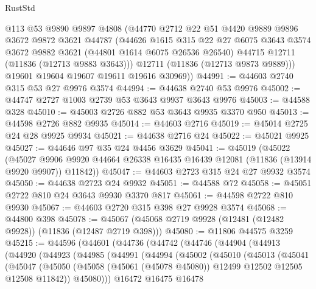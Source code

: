 \begin{lexlean}{RustStd}
\begin{coremodule}
        @113
        @53
        @9890
        @9897
        @4808
        (@44770
          @2712
          @22
          @51
          @4420
          @9889
          @9896
          @3672
          @9872
          @3621
          @44787
          (@44626
            @1615
            @315
            @22
            @27
            @6075
            @3643
            @3574
            @3672
            @9882
            @3621
            (@44801 @1614 @6075 @26536 @26540)
            @44715
            @12711
            (@11836 (@12713 @9883 @3643)))
          @12711
          (@11836 (@12713 @9873 @9889)))
        @19601
        @19604
        @19607
        @19611
        @19616
        @30969))
@44991 := @44603 @2740 @315 @53 @27 @9976 @3574
@44994 := @44638 @2740 @53 @9976
@45002 := @44747 @2727 @1003 @2739 @53 @3643 @9937 @3643 @9976
@45003 := @44588 @328
@45010 := @45003 @2726 @882 @53 @3643 @9935 @3370 @950
@45013 := @44598 @2726 @882 @9935
@45014 := @44603 @2716
@45019 := @45014 @2725 @24 @28 @9925 @9934
@45021 := @44638 @2716 @24
@45022 := @45021 @9925
@45027 := @44646 @97 @35 @24 @4456 @3629
@45041 := @45019
    (@45022
      (@45027 @9906 @9920 @44664 @26338 @16435 @16439 @12081 (@11836 (@13914 @9920 @9907)) @11842))
@45047 := @44603 @2723 @315 @24 @27 @9932 @3574
@45050 := @44638 @2723 @24 @9932
@45051 := @44588 @72
@45058 := @45051 @2722 @810 @24 @3643 @9930 @3370 @817
@45061 := @44598 @2722 @810 @9930
@45067 := @44603 @2720 @315 @398 @27 @9928 @3574
@45068 := @44800 @398
@45078 := @45067 (@45068 @2719 @9928 (@12481 (@12482 @9928)) (@11836 (@12487 @2719 @398)))
@45080 := @11806 @44575 @3259
@45215 := @44596
    (@44601
      (@44736
        (@44742
          (@44746
            (@44904
              (@44913
                (@44920
                  (@44923
                    (@44985
                      (@44991
                        (@44994
                          (@45002
                            (@45010
                              (@45013
                                (@45041
                                  (@45047
                                    (@45050
                                      (@45058
                                        (@45061 (@45078 @45080))
                                        @12499
                                        @12502
                                        @12505
                                        @12508
                                        @11842))
                                    @45080)))
                              @16472
                              @16475
                              @16478

\end{coremodule}
\end{lexlean}
